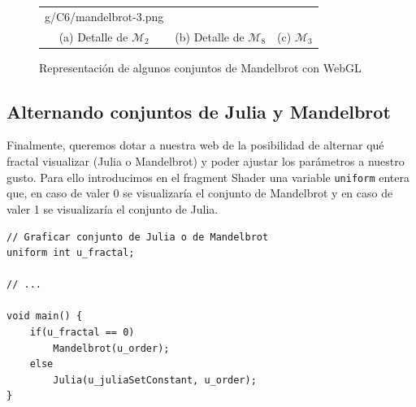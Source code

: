 \begin{figure}[ht]
\begin{tabular}{ccc}
g/C6/mandelbrot-3.png} \\
    (a) Detalle de $\mathcal{M}_2$ & (b) Detalle de $\mathcal{M}_8$ & (c) $\mathcal{M}_3$ \\[6pt]
    \end{tabular}
    \caption{Representación de algunos conjuntos de Mandelbrot con WebGL}
    \label{fig:mandelbrot-webgl}
\end{figure}

\subsection{Alternando conjuntos de Julia y Mandelbrot}
\label{subsection:alternando}

Finalmente, queremos dotar a nuestra web de la posibilidad de alternar qué fractal visualizar (Julia o Mandelbrot) y poder ajustar los parámetros a nuestro gusto. Para ello introducimos en el fragment Shader una variable \verb|uniform| entera que, en caso de valer 0 se visualizaría el conjunto de Mandelbrot y en caso de valer 1 se visualizaría el conjunto de Julia.

\begin{lstlisting}
// Graficar conjunto de Julia o de Mandelbrot
uniform int u_fractal;

// ... 

void main() {
    if(u_fractal == 0)
        Mandelbrot(u_order);
    else
        Julia(u_juliaSetConstant, u_order);
}
\end{lstlisting}